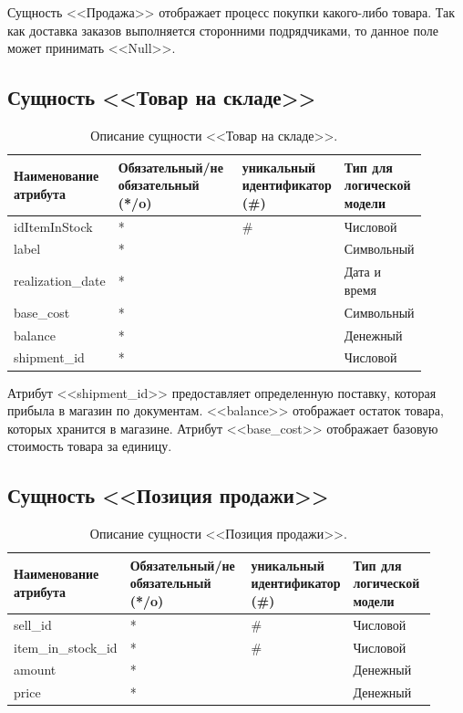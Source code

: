 \documentclass[14pt]{extreport}
\begin{document}
        Сущность <<Продажа>> отображает процесс покупки какого-либо товара. Так как доставка заказов выполняется сторонними подрядчиками, то данное поле может принимать <<Null>>.

    \subsection*{Сущность <<Товар на складе>>}

        \begin{table}[H]
            \begin{tabular}{|p{0.2\linewidth}|p{0.3\linewidth}|p{0.2\linewidth}|p{0.2\linewidth}|}
                \hline
                Наименование атрибута & Обязательный/не обязательный (*/o) & уникальный идентификатор (\#) & Тип для логической модели
                \\ \hline
                idItemInStock & * & \# & Числовой \\ \hline
                label & * & & Символьный\\ \hline
                realization\_date & * & & Дата и время \\ \hline
                base\_cost & * &  & Символьный  \\ \hline
                balance & * & & Денежный \\ \hline
                shipment\_id & * & & Числовой \\ \hline 
            \end{tabular}
            \caption{Описание сущности <<Товар на складе>>.}
        \end{table}

        Атрибут <<shipment\_id>> предоставляет определенную поставку, которая прибыла в магазин по документам.%
        <<balance>> отображает остаток товара, которых хранится в магазине. Атрибут <<base\_cost>> отображает базовую стоимость товара за единицу. 
    
        \subsection*{Сущность <<Позиция продажи>>}

        \begin{table}[H]
            \begin{tabular}{|p{0.225\linewidth}|p{0.3\linewidth}|p{0.2\linewidth}|p{0.2\linewidth}|}
                \hline
                Наименование атрибута & Обязательный/не обязательный (*/o) & уникальный идентификатор (\#) & Тип для логической модели
                \\ \hline
                sell\_id & * & \# & Числовой\\ \hline
                item\_in\_stock\_id & * & \# & Числовой \\ \hline
                amount & * & & Денежный \\ \hline
                price & * & & Денежный \\ \hline
            \end{tabular}
            \caption{Описание сущности <<Позиция продажи>>.}
        \end{table}
\end{document}
